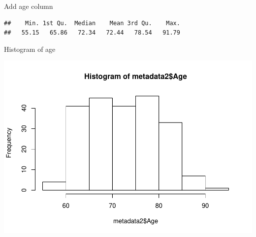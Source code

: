 \documentclass[]{article}
\newenvironment{Shaded}{\begin{snugshade}}{\end{snugshade}}
\newcommand{\KeywordTok}[1]{\textcolor[rgb]{0.13,0.29,0.53}{\textbf{#1}}}
\newcommand{\DataTypeTok}[1]{\textcolor[rgb]{0.13,0.29,0.53}{#1}}
\newcommand{\DecValTok}[1]{\textcolor[rgb]{0.00,0.00,0.81}{#1}}
\newcommand{\FloatTok}[1]{\textcolor[rgb]{0.00,0.00,0.81}{#1}}
\newcommand{\StringTok}[1]{\textcolor[rgb]{0.31,0.60,0.02}{#1}}
\newcommand{\OperatorTok}[1]{\textcolor[rgb]{0.81,0.36,0.00}{\textbf{#1}}}
\newcommand{\NormalTok}[1]{#1}
\begin{document}
Add age column

\begin{Shaded}
\end{Shaded}

\begin{verbatim}
##    Min. 1st Qu.  Median    Mean 3rd Qu.    Max. 
##   55.15   65.86   72.34   72.44   78.54   91.79
\end{verbatim}

Histogram of age

\begin{Shaded}
\end{Shaded}

\includegraphics{20180125_summary_to_date_files/figure-latex/unnamed-chunk-62-1.pdf}
\end{document}
